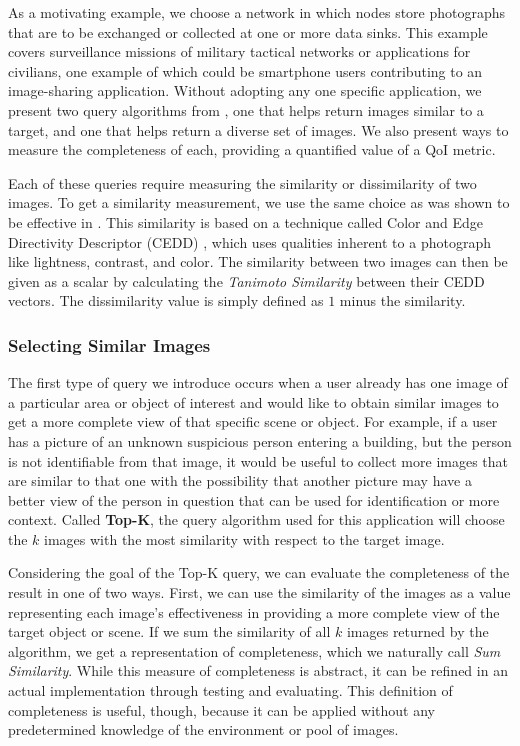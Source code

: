 As a motivating example, we choose a network in which nodes store photographs that are to be exchanged or collected at one or more data sinks.  This example covers surveillance missions of military tactical networks or applications for civilians, one example of which could be smartphone users contributing to an image-sharing application.  Without adopting any one specific application, we present two query algorithms from \cite{mediascope}, one that helps return images similar to a target, and one that helps return a diverse set of images.  We also present ways to measure the completeness of each, providing a quantified value of a QoI metric.

Each of these queries require measuring the similarity or dissimilarity of two images.  To get a similarity measurement, we use the same choice as was shown to be effective in \cite{mediascope}.  This similarity is based on a technique called Color and Edge Directivity Descriptor (CEDD) \cite{2008cedd}, which uses qualities inherent to a photograph like lightness, contrast, and color.  The similarity between two images can then be given as a scalar by calculating the \emph{Tanimoto Similarity} \cite{tanimoto} between their CEDD vectors.  The dissimilarity value is simply defined as $1$ minus the similarity.

\subsubsection{Selecting Similar Images}

The first type of query we introduce occurs when a user already has one image of a particular area or object of interest and would like to obtain similar images to get a more complete view of that specific scene or object.  For example, if a user has a picture of an unknown suspicious person entering a building, but the person is not identifiable from that image, it would be useful to collect more images that are similar to that one with the possibility that another picture may have a better view of the person in question that can be used for identification or more context.  Called {\bf Top-K}, the query algorithm used for this application will choose the $k$ images with the most similarity with respect to the target image.  

Considering the goal of the Top-K query, we can evaluate the completeness of the result in one of two ways.  First, we can use the similarity of the images as a value representing each image's effectiveness in providing a more complete view of the target object or scene.  If we sum the similarity of all $k$ images returned by the algorithm, we get a representation of completeness, which we naturally call \emph{Sum Similarity}.  While this measure of completeness is abstract, it can be refined in an actual implementation through testing and evaluating.  This definition of completeness is useful, though, because it can be applied without any predetermined knowledge of the environment or pool of images.  

